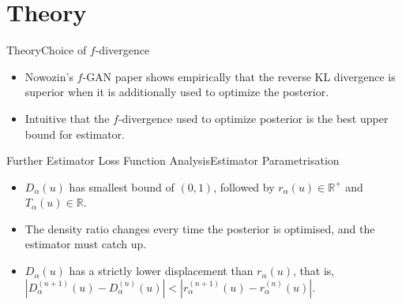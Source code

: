 \documentclass[handout]{beamer}
\newcommand{\R}{\mathbb{R}}
\begin{document}

\section{Theory}
\begin{frame}{Theory}{Choice of $f$-divergence}
\begin{itemize}
\item Nowozin's $f$-GAN paper shows empirically that the reverse KL divergence is superior when it is additionally used to optimize the posterior.
\vspace{0.5cm}
\item Intuitive that the $f$-divergence used to optimize posterior is the best upper bound for estimator.
\end{itemize}
\end{frame}
\begin{frame}{Further Estimator Loss Function Analysis}{Estimator Parametrisation}
\begin{itemize}
\item $D_\alpha(u)$ has smallest bound of $(0,1)$, followed by $r_\alpha(u) \in \R^+$ and $T_\alpha(u)\in \R$.
\vspace{0.5cm}
\item The density ratio changes every time the posterior is optimised, and the estimator must catch up.
\vspace{0.5cm}
\item $D_\alpha(u)$ has a strictly lower displacement than $r_\alpha(u)$, that is, $|D_\alpha^{(n+1)}(u)-D_\alpha^{(n)}(u)|<|r_\alpha^{(n+1)}(u)-r_\alpha^{(n)}(u)|$.
\end{itemize}
\end{frame}
\end{document}
